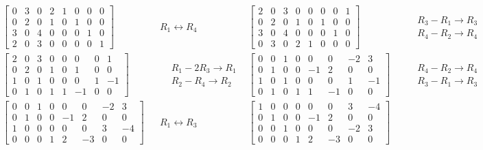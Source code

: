 \documentclass{report}
\begin{document}
\begin{align*}
	&\left[\begin{array}{cccc|cccc}
		0 & 3 & 0 & 2 & 1 & 0 & 0 & 0 \\
		0 & 2 & 0 & 1 & 0 & 1 & 0 & 0 \\
		3 & 0 & 4 & 0 & 0 & 0 & 1 & 0 \\
		2 & 0 & 3 & 0 & 0 & 0 & 0 & 1
	\end{array}\right]
	&& R_1 \leftrightarrow R_4
	&\left[\begin{array}{cccc|cccc}
		2 & 0 & 3 & 0 & 0 & 0 & 0 & 1 \\
		0 & 2 & 0 & 1 & 0 & 1 & 0 & 0 \\
		3 & 0 & 4 & 0 & 0 & 0 & 1 & 0 \\
		0 & 3 & 0 & 2 & 1 & 0 & 0 & 0
	\end{array}\right]
	&& \begin{aligned} & R_3 - R_1 \rightarrow R_3 \\ & R_4 - R_2 \rightarrow R_4 \end{aligned} \\
	&\left[\begin{array}{cccc|cccc}
		2 & 0 & 3 & 0 & 0 & 0 & 0 & 1 \\
		0 & 2 & 0 & 1 & 0 & 1 & 0 & 0 \\
		1 & 0 & 1 & 0 & 0 & 0 & 1 & -1 \\
		0 & 1 & 0 & 1 & 1 & -1 & 0 & 0
	\end{array}\right]
	&& \begin{aligned} & R_1 - 2R_3 \rightarrow R_1 \\ & R_2 - R_4 \rightarrow R_2 \end{aligned}
	&\left[\begin{array}{cccc|cccc}
		0 & 0 & 1 & 0 & 0 & 0 & -2 & 3 \\
		0 & 1 & 0 & 0 & -1 & 2 & 0 & 0 \\
		1 & 0 & 1 & 0 & 0 & 0 & 1 & -1 \\
		0 & 1 & 0 & 1 & 1 & -1 & 0 & 0
	\end{array}\right]
	&& \begin{aligned} & R_4 - R_2 \rightarrow R_4 \\ & R_3 - R_1 \rightarrow R_3 \end{aligned} \\
	&\left[\begin{array}{cccc|cccc}
		0 & 0 & 1 & 0 & 0 & 0 & -2 & 3 \\
		0 & 1 & 0 & 0 & -1 & 2 & 0 & 0 \\
		1 & 0 & 0 & 0 & 0 & 0 & 3 & -4 \\
		0 & 0 & 0 & 1 & 2 & -3 & 0 & 0
	\end{array}\right]
	&& R_1 \leftrightarrow R_3
	&\left[\begin{array}{cccc|cccc}
		1 & 0 & 0 & 0 & 0 & 0 & 3 & -4 \\
		0 & 1 & 0 & 0 & -1 & 2 & 0 & 0 \\
		0 & 0 & 1 & 0 & 0 & 0 & -2 & 3 \\
		0 & 0 & 0 & 1 & 2 & -3 & 0 & 0
	\end{array}\right]
\end{align*}
\end{document}
